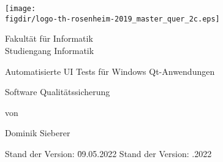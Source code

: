 \begin{titlepage}

\sffamily

\raggedleft

\vspace*{-2cm}

\texttt{[image: \\figdir/logo-th-rosenheim-2019\_master\_quer\_2c.eps]}

\vfill

\centering
\LARGE
Fakultät für Informatik  \vspace{0.5cm}\\
\Large
Studiengang Informatik

\vspace{2cm}

\LARGE

\centerline{Automatisierte UI Tests für Windows Qt-Anwendungen}	 


\vspace{2cm}

\Large
Software Qualitätssicherung

\vspace{1.5cm}


\Large
von

\vspace{0.5cm}


\LARGE
Dominik Sieberer \vspace{1cm}

\vspace{1cm}

\flushleft
 \Large
\vspace*{\fill}

\begin{tabbing}
Stand der Version: \= 09.05.2022 \kill
Stand der Version: .2022 \\
\end{tabbing}

\end{titlepage}

\cleardoubleemptypage









